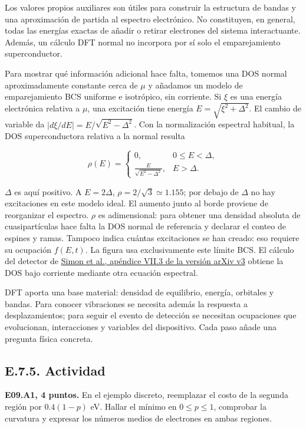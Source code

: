 \documentclass[
  spanish,
  10pt,
  a4paper,
]{article}
\begin{document}
Los valores propios auxiliares son útiles para construir la estructura
de bandas y una aproximación de partida al espectro electrónico. No
constituyen, en general, todas las energías exactas de añadir o retirar
electrones del sistema interactuante. Además, un cálculo DFT normal no
incorpora por sí solo el emparejamiento superconductor.

Para mostrar qué información adicional hace falta, tomemos una DOS
normal aproximadamente constante cerca de \(\mu\) y añadamos un modelo
de emparejamiento BCS uniforme e isotrópico, sin corriente. Si \(\xi\)
es una energía electrónica relativa a \(\mu\), una excitación tiene
energía \(E=\sqrt{\xi^2+\Delta^2}\). El cambio de variable da
\(|d\xi/dE|=E/\sqrt{E^2-\Delta^2}\). Con la normalización espectral
habitual, la DOS superconductora relativa a la normal resulta

\[
\rho(E)=\begin{cases}
0,&0\le E<\Delta,\\
\displaystyle\frac{E}{\sqrt{E^2-\Delta^2}},&E>\Delta.
\end{cases}
\tag{E09.f}
\]

\(\Delta\) es aquí positivo. A \(E=2\Delta\),
\(\rho=2/\sqrt3\simeq1.155\); por debajo de \(\Delta\) no hay
excitaciones en este modelo ideal. El aumento junto al borde proviene de
reorganizar el espectro. \(\rho\) es adimensional: para obtener una
densidad absoluta de cuasipartículas hace falta la DOS normal de
referencia y declarar el conteo de espines y ramas. Tampoco indica
cuántas excitaciones se han creado: eso requiere su ocupación
\(f(E,t)\). La figura usa exclusivamente este límite BCS. El cálculo del
detector de \href{https://arxiv.org/html/2501.13791v3}{Simon et al.,
apéndice VII.3 de la versión arXiv v3} obtiene la DOS bajo corriente
mediante otra ecuación espectral.

DFT aporta una base material: densidad de equilibrio, energía, orbitales
y bandas. Para conocer vibraciones se necesita además la respuesta a
desplazamientos; para seguir el evento de detección se necesitan
ocupaciones que evolucionan, interacciones y variables del dispositivo.
Cada paso añade una pregunta física concreta.

\subsection{E.7.5. Actividad}\label{e.7.5.-actividad}


\textbf{E09.A1, 4 puntos.} En el ejemplo discreto, reemplazar el costo
de la segunda región por \(0.4(1-p)\) eV. Hallar el mínimo en
\(0\le p\le1\), comprobar la curvatura y expresar los números medios de
electrones en ambas regiones.
\end{document}
